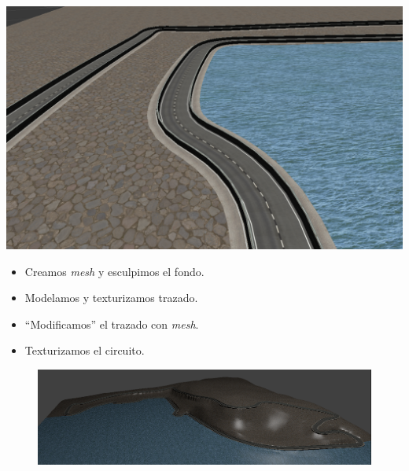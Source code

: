 \documentclass[notes,slidesec,a4]{seminar}
\begin{document}
\begin{hslide}
\begin{minipage}{0.5\textwidth}
	\end{minipage}
	\begin{minipage}{0.53\textwidth}
		\includegraphics[width=\textwidth]{MonacoPlano2.png}
	\end{minipage}
\end{hslide}

\begin{hslide}
	\begin{itemize}
		\item Creamos \textit{mesh} y esculpimos el fondo.
		\item Modelamos y texturizamos trazado.
		\item “Modificamos” el trazado con \textit{mesh}.
		\item Texturizamos el circuito.
	\end{itemize}
	\begin{center}
		\begin{figure}
			\includegraphics[width=\textwidth]{MonacoElev05.png}
		\end{figure}
	\end{center}
\end{hslide}
\end{document}
